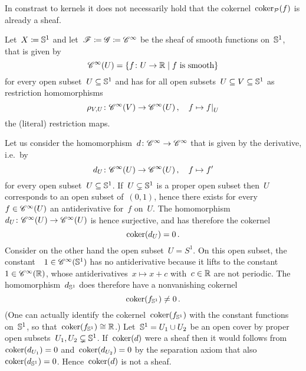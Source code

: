\begin{example}
\begin{enumerate}
      In constrast to kernels it does not necessarily hold that the cokernel~$\operatorname{coker}_{\mathcal{P}}(f)$ is already a sheaf.
      
      \begin{examplenonum}
        Let~$X \coloneqq \mathbb{S}^1$ and let~$\mathscr{F} \coloneqq \mathscr{G} \coloneqq \mathscr{C}^\infty$ be the sheaf of smooth  functions on~$\mathbb{S}^1$, that is given by
        \[
            \Cs^\infty(U)
          = \{
              f \colon U \to \Real
            \suchthat
              \text{$f$ is smooth}
            \}
        \]
        for every open subset~$U \subseteq \mathbb{S}^1$ and has for all open subsets~$U \subseteq V \subseteq \mathbb{S}^1$ as restriction homomorphisms
        \[
                  \rho_{V,U}
          \colon  \Cs^\infty(V)
          \to     \Cs^\infty(U) \,,
          \quad   f
          \mapsto \restrict{f}{U}
        \]
        the (literal) restriction maps.

        Let us consider the homomorphism~$d \colon \mathscr{C}^\infty \to \mathscr{C}^\infty$ that is given by the derivative, i.e.\ by
        \[
                  d_U
          \colon  \mathscr{C}^\infty(U)
          \to     \mathscr{C}^\infty(U) \,,
          \quad   f
          \mapsto f'
        \]
        for every open subset~$U \subseteq \mathbb{S}^1$.
        If~$U \subsetneq \mathbb{S}^1$ is a proper open subset then~$U$ corresponds to an open subset of~$(0,1)$, hence there exists for every~$f \in \mathscr{C}^\infty(U)$ an antiderivative for~$f$ on~$U$.
        The homomorphism~$d_U \colon \mathscr{C}^\infty(U) \to \mathscr{C}^\infty(U)$ is hence surjective, and has therefore the cokernel
        \[
            \operatorname{coker}(d_U)
          = 0 \,.
        \]
        Consider on the other hand the open subset~$U = S^1$.
        On this open subset, the constant~~$1 \in \mathscr{C}^\infty(\mathbb{S}^1)$ has no antiderivative because it lifts to the constant~~$1 \in \mathscr{C}^\infty(\mathbb{R})$, whose antiderivatives~$x \mapsto x + c$ with~$c \in \mathbb{R}$ are not periodic.
        The homomorphism~$d_{\mathbb{S}^1}$ does therefore have a nonvanishing cokernel
        \[
                \operatorname{coker}(f_{\mathbb{S}^1})
          \neq  0 \,.
        \]
        (One can actually identify the cokernel~$\operatorname{coker}(f_{\mathbb{S}^1})$ with the constant functions on~$\mathbb{S}^1$, so that~$\operatorname{coker}(f_{\mathbb{S}^1}) \cong \mathbb{R}$.)
        Let~$\mathbb{S}^1 = U_1 \cup U_2$ be an open cover by proper open subsets~$U_1, U_2 \subsetneq \mathbb{S}^1$.
        If~$\operatorname{coker}(d)$ were a sheaf then it would follows from~$\operatorname{coker}(d_{U_1}) = 0$ and~$\operatorname{coker}(d_{U_2}) = 0$ by the separation axiom that also~$\operatorname{coker}(d_{\mathbb{S}^1}) = 0$.
        Hence~$\operatorname{coker}(d)$ is not a sheaf.
      \end{examplenonum}
      

\end{enumerate}
\end{example}
